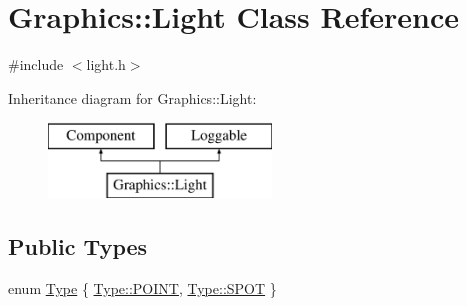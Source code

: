 \hypertarget{class_graphics_1_1_light}{}\section{Graphics\+:\+:Light Class Reference}
\label{class_graphics_1_1_light}


{\ttfamily \#include $<$light.\+h$>$}

Inheritance diagram for Graphics\+:\+:Light\+:\begin{figure}[H]
\begin{center}
\leavevmode
\includegraphics[height=2.000000cm]{class_graphics_1_1_light}
\end{center}
\end{figure}
\subsection*{Public Types}
\begin{DoxyCompactItemize}
\item 
enum \hyperlink{class_graphics_1_1_light_a6c3bc4c73b1bc4a96e0376be4ce0c007}{Type} \{ \hyperlink{class_graphics_1_1_light_a6c3bc4c73b1bc4a96e0376be4ce0c007aaebdbcb765394d25d6a604589a890f82}{Type\+::\+P\+O\+I\+N\+T}, 
\hyperlink{class_graphics_1_1_light_a6c3bc4c73b1bc4a96e0376be4ce0c007a5bac85a0c611ddef64ab0dfb383056f4}{Type\+::\+S\+P\+O\+T}
 \}
\end{DoxyCompactItemize}
